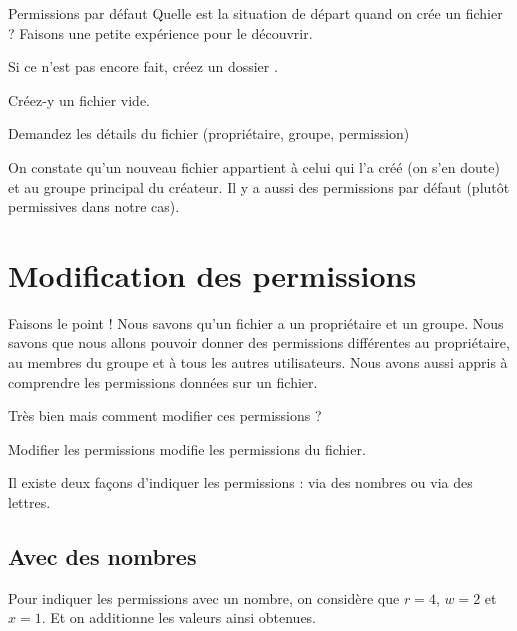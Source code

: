 \documentclass[a4paper,11pt]{style-esi/td}
\begin{document}
		\begin{Experience}{Permissions par défaut}
			Quelle est la situation de départ quand on crée un fichier ?
			Faisons une petite expérience pour le découvrir.
			\begin{steps}
			\item Si ce n'est pas encore fait, créez un dossier .
			\item Créez-y un fichier vide.
			\item Demandez les détails du fichier (propriétaire, groupe, permission)
			\end{steps}
			On constate qu'un nouveau fichier appartient à celui qui l'a créé 
			(on s'en doute) et au groupe principal du créateur. 
			Il y a aussi des permissions par défaut (plutôt permissives dans notre cas).  
		\end{Experience}		
	
	\section{Modification des permissions}

		\begin{infotbox}{Faisons le point !}
			Nous savons qu'un fichier a un propriétaire et un groupe.
			Nous savons que nous allons pouvoir donner des permissions
			différentes au propriétaire, au membres du groupe 
			et à tous les autres utilisateurs.
			Nous avons aussi appris à comprendre les permissions données sur un fichier.
		\end{infotbox}
	
		Très bien mais comment modifier ces permissions ?

		\begin{theorie}{Modifier les permissions}
			 modifie les permissions du fichier.
		\end{theorie}

		Il existe deux façons d'indiquer les permissions : via des nombres ou via des lettres.

		\subsection{Avec des nombres}

			Pour indiquer les permissions avec un nombre, 
			on considère que $r=4$, $w=2$ et $x=1$. 
			Et on additionne les valeurs ainsi obtenues.
\end{document}
